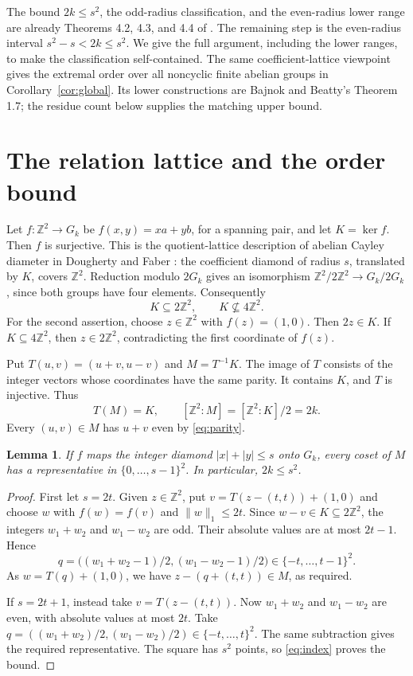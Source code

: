 \documentclass[11pt]{article}
\newtheorem{lemma}[theorem]{Lemma}
\newcommand{\Z}{\mathbb Z}
\newcommand{\Gk}{G_k}
\newcommand{\norm}[1]{\lVert #1\rVert_1}
\begin{document}
The bound $2k\le s^2$, the odd-radius classification, and the even-radius
lower range are already Theorems 4.2, 4.3, and 4.4 of \cite{BB}.
The remaining step is the even-radius interval $s^2-s<2k\le s^2$.
We give the full argument, including the lower ranges, to make the
classification self-contained.
The same coefficient-lattice viewpoint gives the extremal order over
all noncyclic finite abelian groups in Corollary~\ref{cor:global}.
Its lower constructions are Bajnok and Beatty's Theorem 1.7;
the residue count below supplies the matching upper bound.

\section{The relation lattice and the order bound}
Let $f:\Z^2\to\Gk$ be $f(x,y)=xa+yb$, for a spanning pair, and let
$K=\ker f$. Then $f$ is surjective. This is the quotient-lattice description
of abelian Cayley diameter in Dougherty and Faber \cite[Proposition 2]{DF}:
the coefficient diamond of radius $s$, translated by $K$, covers $\Z^2$.
Reduction modulo $2\Gk$ gives an
isomorphism $\Z^2/2\Z^2\to\Gk/2\Gk$, since both groups have four
elements. Consequently
\begin{equation}\label{eq:parity}
K\subseteq2\Z^2,\qquad K\not\subseteq4\Z^2.
\end{equation}
For the second assertion, choose $z\in\Z^2$ with $f(z)=(1,0)$.
Then $2z\in K$. If $K\subseteq4\Z^2$, then $z\in2\Z^2$,
contradicting the first coordinate of $f(z)$.

Put $T(u,v)=(u+v,u-v)$ and $M=T^{-1}K$. The image of $T$ consists of
the integer vectors whose coordinates have the same parity. It contains
$K$, and $T$ is injective. Thus
\begin{equation}\label{eq:index}
T(M)=K,\qquad [\Z^2:M]=[\Z^2:K]/2=2k.
\end{equation}
Every $(u,v)\in M$ has $u+v$ even by \eqref{eq:parity}.

\begin{lemma}\label{lem:square}
If $f$ maps the integer diamond $|x|+|y|\le s$ onto $\Gk$, every
coset of $M$ has a representative in $\{0,\ldots,s-1\}^2$.
In particular, $2k\le s^2$.
\end{lemma}
\begin{proof}
First let $s=2t$. Given $z\in\Z^2$, put
$v=T(z-(t,t))+(1,0)$ and choose $w$ with $f(w)=f(v)$ and
$\norm{w}\le2t$. Since $w-v\in K\subseteq2\Z^2$, the integers
$w_1+w_2$ and $w_1-w_2$ are odd. Their absolute values are at most
$2t-1$. Hence
\[
q=\big((w_1+w_2-1)/2,(w_1-w_2-1)/2\big)
\in\{-t,\ldots,t-1\}^2.
\]
As $w=T(q)+(1,0)$, we have $z-(q+(t,t))\in M$, as required.

If $s=2t+1$, instead take $v=T(z-(t,t))$. Now $w_1+w_2$ and
$w_1-w_2$ are even, with absolute values at most $2t$.
Take $q=((w_1+w_2)/2,(w_1-w_2)/2)\in\{-t,\ldots,t\}^2$.
The same subtraction gives the required representative. The square has
$s^2$ points, so \eqref{eq:index} proves the bound.
\end{proof}
\end{document}
